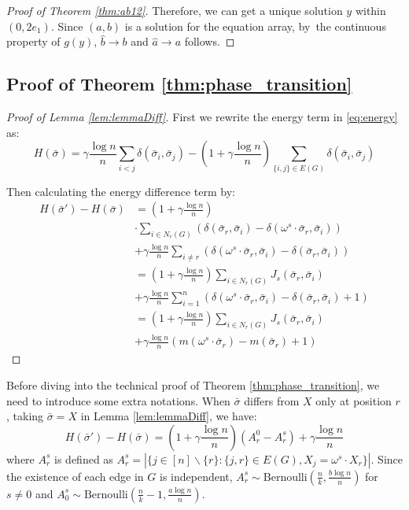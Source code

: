 \documentclass[entropy,article,accept,moreauthors,pdftex]{Definitions/mdpi}
\newcommand{\A}{\frac{a \log n}{n}}
\newcommand{\B}{\frac{b \log n}{n}}
\newcommand{\1}{\mathbbm{1}}
\begin{document}
\begin{paracol}{2}
\begin{proof}[Proof of Theorem \ref{thm:ab12}]
Therefore, we can get a unique solution $y$ within $(0, 2e_1)$. Since $(a,b)$ is a solution for the equation array, by~the continuous property of $g(y)$, $\hat{b} \to b$ and $\hat{a} \to a$ follows.
\end{proof}
\subsection{Proof of Theorem \ref{thm:phase_transition}}\label{subsec:pt}
\begin{proof}[Proof of Lemma \ref{lem:lemmaDiff}]
	First we rewrite the energy term in \eqref{eq:energy} as:
	\begin{equation*}
	H(\bar{\sigma}) = \gamma \frac{\log n}{n} \sum_{i < j} \delta(\bar{\sigma}_i, \bar{\sigma}_j)
	- (1 + \gamma\frac{\log n}{n}) \sum_{ \{i, j\} \in E(G)} \delta(\bar{\sigma}_i, \bar{\sigma}_j)
	\end{equation*}
	
	Then calculating the energy difference term by:
	\begin{align*}
	H(\bar{\sigma}') - H(\bar{\sigma}) &= (1 + \gamma\frac{\log n}{n}) \\
	&\cdot \sum_{i \in N_r(G)} (\delta(\bar{\sigma}_r, \bar{\sigma}_i) -
	\delta(\omega^s \cdot \bar{\sigma}_r, \bar{\sigma}_i)) \\
	&+ \gamma \frac{\log n}{n}\sum_{i\neq r}
	( \delta(\omega^s \cdot \bar{\sigma}_r, \bar{\sigma}_i) -
	\delta( \bar{\sigma}_r, \bar{\sigma}_i) ) \\
	& = (1 + \gamma\frac{\log n}{n})\sum_{i \in N_r(G)} J_s(\bar{\sigma}_r, \bar{\sigma}_i) \\
	&+ \gamma \frac{\log n}{n}\sum_{i=1}^n
	( \delta(\omega^s \cdot \bar{\sigma}_r, \bar{\sigma}_i) -
	\delta( \bar{\sigma}_r, \bar{\sigma}_i) +1) \\
	&= (1+\gamma \frac{\log n}{n})\sum_{i \in N_r(G)} J_s(\bar{\sigma}_r, \bar{\sigma}_i)\\
	&+ \gamma \frac{\log n}{n} (m(\omega^s \cdot \bar{\sigma}_r)-m(\bar{\sigma}_r)+1)
	\end{align*}
\end{proof}
Before diving into the technical proof of Theorem \ref{thm:phase_transition}, we need to introduce some extra
notations. When $\bar{\sigma}$ differs from $X$ only at position $r$, taking $\bar{\sigma}=X$ in Lemma \ref{lem:lemmaDiff}, we have:
\begin{equation}\label{eq:energy_diff}
H(\bar{\sigma}') - H(\bar{\sigma}) = (1+\gamma \frac{\log n}{n})(A^0_r - A^s_r) + \gamma\frac{\log n}{n}
\end{equation}
where $A^s_r$ is defined as $A^s_r = |\{j \in [n]\backslash \{r\}: \{j, r\} \in E(G), X_j = \omega^s \cdot X_r \}|$.
Since the existence of each edge in $G$ is independent, $A^s_r \sim \textrm{Bernoulli}(\frac{n}{k}, \B ) $ for $s\neq 0$
and $A^s_0 \sim \textrm{Bernoulli}(\frac{n}{k}-1, \A )$.


\end{paracol}
\end{document}
